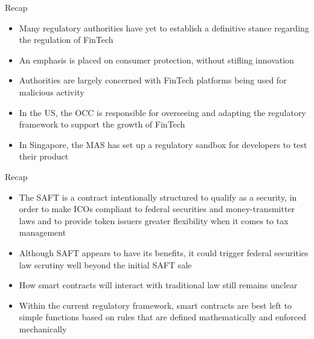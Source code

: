 \documentclass[10pt]{beamer}
\begin{document}


\begin{frame}{Recap}
	\begin{itemize}
		\item Many regulatory authorities have yet to establish a definitive stance regarding the regulation of FinTech
		\item An emphasis is placed on consumer protection, without stifling innovation
		\item Authorities are largely concerned with FinTech platforms being used for malicious activity
		\item In the US, the OCC is responsible for overseeing and adapting the regulatory framework to support the growth of FinTech
		\item In Singapore, the MAS has set up a regulatory sandbox for developers to test their product
	\end{itemize}
\end{frame}


\begin{frame}{Recap}
	\begin{itemize}
		\item The SAFT is a contract intentionally structured to qualify as a security, in order to make ICOs compliant to federal securities and money-transmitter laws and to provide token issuers greater flexibility when it comes to tax management
		\item Although SAFT appears to have its benefits, it could trigger federal securities law scrutiny well beyond the initial SAFT sale
		\item How smart contracts will interact with traditional law still remains unclear
		\item Within the current regulatory framework, smart contracts are best left to simple functions based on rules that are defined mathematically and enforced mechanically
	\end{itemize}
\end{frame}

\end{document}
